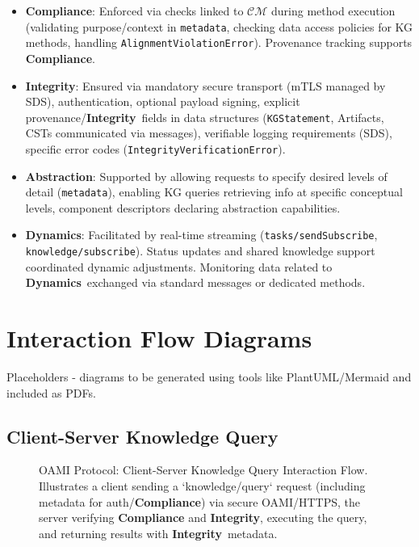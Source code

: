 \documentclass[12pt,a4paper]{report}
\newcommand{\Compliance}{\textbf{Compliance}}
\newcommand{\Integrity}{\textbf{Integrity}}
\newcommand{\Abstraction}{\textbf{Abstraction}}
\newcommand{\Dynamics}{\textbf{Dynamics}}
\begin{document}
	\begin{itemize}
		\item \textbf{\Compliance}: Enforced via checks linked to $\mathcal{CM}$ during method execution (validating purpose/context in \texttt{metadata}, checking data access policies for KG methods, handling \texttt{AlignmentViolationError}). Provenance tracking supports \textbf{Compliance}.
		\item \textbf{\Integrity}: Ensured via mandatory secure transport (mTLS managed by SDS), authentication, optional payload signing, explicit provenance/\Integrity\ fields in data structures (\texttt{KGStatement}, Artifacts, CSTs communicated via messages), verifiable logging requirements (SDS), specific error codes (\texttt{IntegrityVerificationError}).
		\item \textbf{\Abstraction}: Supported by allowing requests to specify desired levels of detail (\texttt{metadata}), enabling KG queries retrieving info at specific conceptual levels, component descriptors declaring abstraction capabilities.
		\item \textbf{\Dynamics}: Facilitated by real-time streaming (\texttt{tasks/sendSubscribe}, \texttt{knowledge/subscribe}). Status updates and shared knowledge support coordinated dynamic adjustments. Monitoring data related to \Dynamics\ exchanged via standard messages or dedicated methods.
	\end{itemize}
	
	\section{Interaction Flow Diagrams}
	\label{app:oami_flow_diagrams}
	
	Placeholders - diagrams to be generated using tools like PlantUML/Mermaid and included as PDFs.
	
	\subsection{Client-Server Knowledge Query}
	\label{app:oami_flow_client_server}
	
	\begin{figure}[H]
		\centering
		\caption{OAMI Protocol: Client-Server Knowledge Query Interaction Flow. Illustrates a client sending a `knowledge/query` request (including metadata for auth/\textbf{Compliance}) via secure OAMI/HTTPS, the server verifying \textbf{Compliance} and \Integrity, executing the query, and returning results with \Integrity\ metadata.}
		\label{fig:oami_client_server_flow}
	\end{figure}
	
\end{document}

